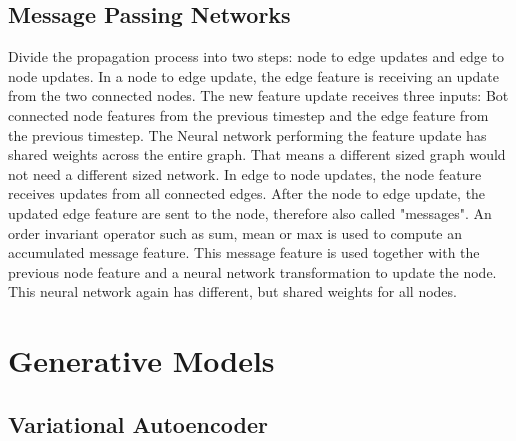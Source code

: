 \documentclass{scrartcl}
\begin{document}
\subsection*{Message Passing Networks}
Divide the propagation process into two steps: node to edge updates and edge to node updates.
In a node to edge update, the edge feature is receiving an update from the two connected nodes. The new feature update receives three inputs: Bot connected node features from the previous timestep and the edge feature from the previous timestep. The Neural network performing the feature update has shared weights across the entire graph. That means a different sized graph would not need a different sized network.
In edge to node updates, the node feature receives updates from all connected edges. After the node to edge update, the updated edge feature are sent to the node, therefore also called "messages". An order invariant operator such as sum, mean or max is used to compute an accumulated message feature. This message feature is used together with the previous node feature and a neural network transformation to update the node. This neural network again has different, but shared weights for all nodes.


\section*{Generative Models}
\subsection*{Variational Autoencoder}
\end{document}
